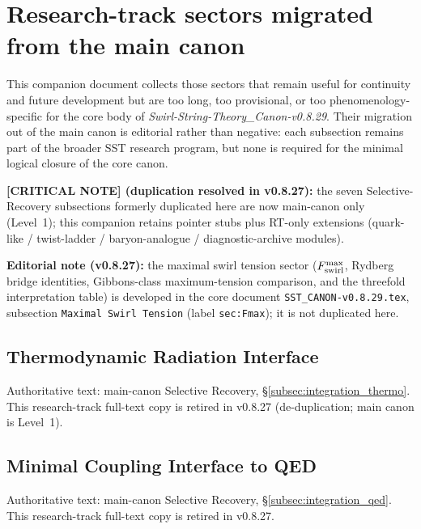\makeatletter
{}
\makeatother


\section{Research-track sectors migrated from the main canon}

\noindent
This companion document collects those sectors that remain useful for continuity and future development but are too long, too provisional, or too phenomenology-specific for the core body of \textit{Swirl-String-Theory\_Canon-v0.8.29}. Their migration out of the main canon is editorial rather than negative: each subsection remains part of the broader SST research program, but none is required for the minimal logical closure of the core canon.

\medskip
\noindent
\textbf{[CRITICAL NOTE] (duplication resolved in v0.8.27):} the seven Selective-Recovery subsections formerly duplicated here are now main-canon only (Level~1); this companion retains pointer stubs plus RT-only extensions (quark-like / twist-ladder / baryon-analogue / diagnostic-archive modules).

\medskip
\noindent
\textbf{Editorial note (v0.8.27):} the maximal swirl tension sector ($F_{\rm swirl}^{\max}$, Rydberg bridge identities, Gibbons-class maximum-tension comparison, and the threefold interpretation table) is developed in the core document \texttt{SST\_CANON-v0.8.29.tex}, subsection \texttt{Maximal Swirl Tension} (label \texttt{sec:Fmax}); it is not duplicated here.

\medskip








\subsection{Thermodynamic Radiation Interface}
\noindent
Authoritative text: main-canon Selective Recovery, \S\ref{subsec:integration_thermo}. This research-track full-text copy is retired in v0.8.27 (de-duplication; main canon is Level~1).

\subsection{Minimal Coupling Interface to QED}
\noindent
Authoritative text: main-canon Selective Recovery, \S\ref{subsec:integration_qed}. This research-track full-text copy is retired in v0.8.27.

